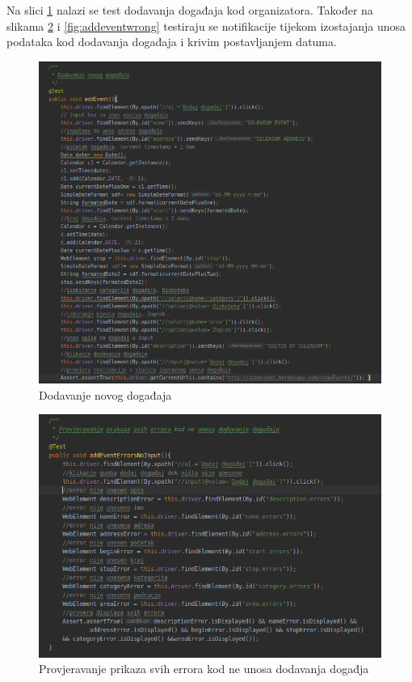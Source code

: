\bigskip

\normalfont\noindent Na slici \ref{fig:addevent} nalazi se test dodavanja događaja kod organizatora. Također na slikama \ref{fig:addeventerrors} i \ref{fig:addeventwrong} testiraju se notifikacije tijekom izostajanja unosa podataka kod dodavanja događaja i krivim postavljanjem datuma.

\begin{figure}[H]
	\includegraphics[scale=0.4]{slike/addEvent.PNG}
	\centering
	\caption{Dodavanje novog događaja}
	\label{fig:addevent}
\end{figure}

\begin{figure}[H]
	\includegraphics[scale=0.4]{slike/addEventErrorsNoInput.PNG}
	\centering
	\caption{Provjeravanje prikaza svih errora kod ne unosa dodavanja događja}
	\label{fig:addeventerrors}
\end{figure}

